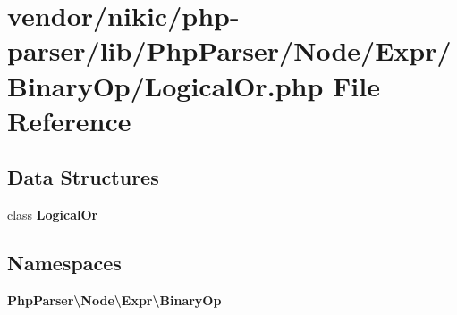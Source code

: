 \section{vendor/nikic/php-\/parser/lib/\+Php\+Parser/\+Node/\+Expr/\+Binary\+Op/\+Logical\+Or.php File Reference}
\label{_logical_or_8php}
\subsection*{Data Structures}
\begin{DoxyCompactItemize}
\item 
class {\bf Logical\+Or}
\end{DoxyCompactItemize}
\subsection*{Namespaces}
\begin{DoxyCompactItemize}
\item 
 {\bf Php\+Parser\textbackslash{}\+Node\textbackslash{}\+Expr\textbackslash{}\+Binary\+Op}
\end{DoxyCompactItemize}
